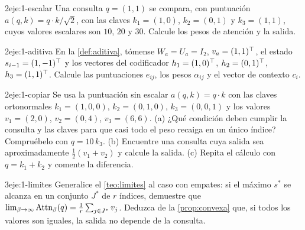 \begin{ejercicio}{2}{eje:1-escalar}
Una consulta $q=(1,1)$ se compara, con puntuación $a(q,k)=q\cdot k/\sqrt{2}$, con las claves $k_1=(1,0)$, $k_2=(0,1)$ y $k_3=(1,1)$, cuyos valores escalares son $10$, $20$ y $30$. Calcule los pesos de atención y la salida.
\end{ejercicio}

\begin{ejercicio}{2}{eje:1-aditiva}
En la \cref{def:aditiva}, tómense $W_a=U_a=I_2$, $v_a=(1,1)^{\top}$, el estado $s_{i-1}=(1,-1)^{\top}$ y los vectores del codificador $h_1=(1,0)^{\top}$, $h_2=(0,1)^{\top}$, $h_3=(1,1)^{\top}$. Calcule las puntuaciones $e_{ij}$, los pesos $\alpha_{ij}$ y el vector de contexto $c_i$.
\end{ejercicio}

\begin{ejercicio}{2}{eje:1-copiar}
Se usa la puntuación sin escalar $a(q,k)=q\cdot k$ con las claves ortonormales $k_1=(1,0,0)$, $k_2=(0,1,0)$, $k_3=(0,0,1)$ y los valores $v_1=(2,0)$, $v_2=(0,4)$, $v_3=(6,6)$. (a) ¿Qué condición deben cumplir la consulta y las claves para que casi todo el peso recaiga en un único índice? Compruébelo con $q=10\,k_3$. (b) Encuentre una consulta cuya salida sea aproximadamente $\tfrac12(v_1+v_2)$ y calcule la salida. (c) Repita el cálculo con $q=k_1+k_2$ y comente la diferencia.
\end{ejercicio}

\begin{ejercicio}{3}{eje:1-limites}
Generalice el \cref{teo:limites} al caso con empates: si el máximo $s^{\ast}$ se alcanza en un conjunto $J^{\ast}$ de $r$ índices, demuestre que $\lim_{\beta\to\infty}\operatorname{Attn}_\beta(q)=\tfrac1r\sum_{j\in J^{\ast}}v_j$. Deduzca de la \cref{prop:convexa} que, si todos los valores son iguales, la salida no depende de la consulta.
\end{ejercicio}
